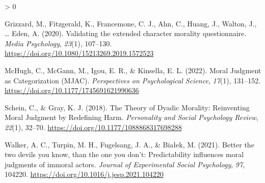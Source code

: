 \documentclass[
  english,
  man,floatsintext]{apa7}
\newlength{\cslhangindent}
\newenvironment{CSLReferences}[2] %
 {%
  \setlength{\parindent}{0pt}
  \ifodd #1 \everypar{\setlength{\hangindent}{\cslhangindent}}\ignorespaces\fi
  \ifnum #2 > 0
  \setlength{\parskip}{#2\baselineskip}
  \fi
 }%
 {}
\begin{document}
\hypertarget{refs}{}
\begin{CSLReferences}{1}{0}
\leavevmode\hypertarget{ref-grizzard_validating_2020}{}%
Grizzard, M., Fitzgerald, K., Francemone, C. J., Ahn, C., Huang, J., Walton, J., \ldots{} Eden, A. (2020). Validating the extended character morality questionnaire. \emph{Media Psychology}, \emph{23}(1), 107--130. \url{https://doi.org/10.1080/15213269.2019.1572523}

\leavevmode\hypertarget{ref-mchugh_moral_2022}{}%
McHugh, C., McGann, M., Igou, E. R., \& Kinsella, E. L. (2022). Moral {Judgment} as {Categorization} ({MJAC}). \emph{Perspectives on Psychological Science}, \emph{17}(1), 131--152. \url{https://doi.org/10.1177/1745691621990636}

\leavevmode\hypertarget{ref-schein_theory_2018}{}%
Schein, C., \& Gray, K. J. (2018). The {Theory} of {Dyadic Morality}: {Reinventing Moral Judgment} by {Redefining Harm}. \emph{Personality and Social Psychology Review}, \emph{22}(1), 32--70. \url{https://doi.org/10.1177/1088868317698288}

\leavevmode\hypertarget{ref-walker_better_2021}{}%
Walker, A. C., Turpin, M. H., Fugelsang, J. A., \& Białek, M. (2021). Better the two devils you know, than the one you don't: {Predictability} influences moral judgments of immoral actors. \emph{Journal of Experimental Social Psychology}, \emph{97}, 104220. \url{https://doi.org/10.1016/j.jesp.2021.104220}

\end{CSLReferences}
\end{document}

